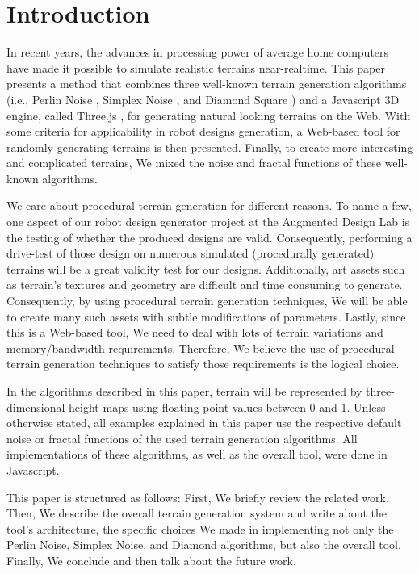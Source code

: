\section{Introduction} %
\label{sec:introduction}

In recent years, the advances in processing power of average home computers have made it possible to simulate realistic terrains near-realtime. This paper presents a method that combines three well-known terrain generation algorithms (i.e., Perlin Noise  \cite{perlin:2002}, Simplex Noise \cite{perlin:2001}, and Diamond Square \cite{fournier:1982}) and a Javascript 3D engine, called Three.js \cite{threeJS}, for generating natural looking terrains on the Web. With some criteria for applicability in robot designs generation, a Web-based tool for randomly generating terrains is then presented. Finally, to create more interesting and complicated terrains, We mixed the noise and fractal functions of these well-known algorithms.     

We care about procedural terrain generation for different reasons. To name a few, one aspect of our robot design generator project at the Augmented Design Lab is the testing of whether the produced designs are valid. Consequently, performing a drive-test of those design on numerous simulated (procedurally generated) terrains will be a great validity test for our designs. Additionally, art assets such as terrain's textures and geometry are difficult and time consuming to generate. Consequently, by using procedural terrain generation techniques, We will be able to create many such assets with subtle modifications of parameters. Lastly, since this is a Web-based tool, We need to deal with lots of terrain variations and memory/bandwidth requirements. Therefore, We believe the use of procedural terrain generation techniques to satisfy those requirements is the logical choice.    

In the algorithms described in this paper, terrain will be represented by three-dimensional height maps using ﬂoating point values between 0 and 1. Unless otherwise stated, all examples explained in this paper use the respective default noise or fractal functions of the used terrain generation algorithms. All implementations of these algorithms, as well as the overall tool, were done in Javascript.  

This paper is structured as follows: First, We briefly review the related work. Then, We describe the overall terrain generation system and write about the tool's architecture, the specific choices We made in implementing not only the Perlin Noise, Simplex Noise, and Diamond algorithms, but also the overall tool. Finally, We conclude and then talk about the future work.  

